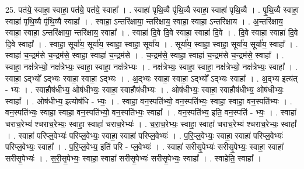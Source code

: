 \documentclass[17pt]{extarticle}
\begin{document}
25. पत॑ये॒ स्वाहा॒ स्वाहा॒ पत॑ये॒ पत॑ये॒ स्वाहा᳚ । . स्वाहा॑ पृथि॒व्यै पृ॑थि॒व्यै स्वाहा॒ स्वाहा॑ पृथि॒व्यै । . पृ॒थि॒व्यै स्वाहा॒ स्वाहा॑ पृथि॒व्यै पृ॑थि॒व्यै स्वाहा᳚ । . स्वाहा॒ ऽन्तरि॑क्षाया॒ न्तरि॑क्षाय॒ स्वाहा॒ स्वाहा॒ ऽन्तरि॑क्षाय । . अ॒न्तरि॑क्षाय॒ स्वाहा॒ स्वाहा॒ ऽन्तरि॑क्षाया॒ न्तरि॑क्षाय॒ स्वाहा᳚ । . स्वाहा॑ दि॒वे दि॒वे स्वाहा॒ स्वाहा॑ दि॒वे । . दि॒वे स्वाहा॒ स्वाहा॑ दि॒वे दि॒वे स्वाहा᳚ । . स्वाहा॒ सूर्या॑य॒ सूर्या॑य॒ स्वाहा॒ स्वाहा॒ सूर्या॑य । . सूर्या॑य॒ स्वाहा॒ स्वाहा॒ सूर्या॑य॒ सूर्या॑य॒ स्वाहा᳚ । . स्वाहा॑ च॒न्द्रम॑से च॒न्द्रम॑से॒ स्वाहा॒ स्वाहा॑ च॒न्द्रम॑से । . च॒न्द्रम॑से॒ स्वाहा॒ स्वाहा॑ च॒न्द्रम॑से च॒न्द्रम॑से॒ स्वाहा᳚ । . स्वाहा॒ नक्ष॑त्रेभ्यो॒ नक्ष॑त्रेभ्यः॒ स्वाहा॒ स्वाहा॒ नक्ष॑त्रेभ्यः । . नक्ष॑त्रेभ्यः॒ स्वाहा॒ स्वाहा॒ नक्ष॑त्रेभ्यो॒ नक्ष॑त्रेभ्यः॒ स्वाहा᳚ । . स्वाहा॒ ऽद्भ्यो᳚ ऽद्भ्यः स्वाहा॒ स्वाहा॒ ऽद्भ्यः । . अ॒द्भ्यः स्वाहा॒ स्वाहा॒ ऽद्भ्यो᳚ ऽद्भ्यः स्वाहा᳚ । . अ॒द्भ्य इत्य॑त् - भ्यः । . स्वाहौष॑धीभ्य॒ ओष॑धीभ्यः॒ स्वाहा॒ स्वाहौष॑धीभ्यः । . ओष॑धीभ्यः॒ स्वाहा॒ स्वाहौष॑धीभ्य॒ ओष॑धीभ्यः॒ स्वाहा᳚ । . ओष॑धीभ्य॒ इत्योष॑धि - भ्यः॒ । . स्वाहा॒ वन॒स्पति॑भ्यो॒ वन॒स्पति॑भ्यः॒ स्वाहा॒ स्वाहा॒ वन॒स्पति॑भ्यः । . वन॒स्पति॑भ्यः॒ स्वाहा॒ स्वाहा॒ वन॒स्पति॑भ्यो॒ वन॒स्पति॑भ्यः॒ स्वाहा᳚ । . वन॒स्पति॑भ्य॒ इति॒ वन॒स्पति॑ - भ्यः॒ । . स्वाहा॑ चराच॒रेभ्य॑ श्चराच॒रेभ्यः॒ स्वाहा॒ स्वाहा॑ चराच॒रेभ्यः॑ । . च॒रा॒च॒रेभ्यः॒ स्वाहा॒ स्वाहा॑ चराच॒रेभ्य॑ श्चराच॒रेभ्यः॒ स्वाहा᳚ । . स्वाहा॑ परिप्ल॒वेभ्यः॑ परिप्ल॒वेभ्यः॒ स्वाहा॒ स्वाहा॑ परिप्ल॒वेभ्यः॑ । . प॒रि॒प्ल॒वेभ्यः॒ स्वाहा॒ स्वाहा॑ परिप्ल॒वेभ्यः॑ परिप्ल॒वेभ्यः॒ स्वाहा᳚ । . प॒रि॒प्ल॒वेभ्य॒ इति॑ परि - प्ल॒वेभ्यः॑ । . स्वाहा॑ सरीसृ॒पेभ्यः॑ सरीसृ॒पेभ्यः॒ स्वाहा॒ स्वाहा॑ सरीसृ॒पेभ्यः॑ । . स॒री॒सृ॒पेभ्यः॒ स्वाहा॒ स्वाहा॑ सरीसृ॒पेभ्यः॑ सरीसृ॒पेभ्यः॒ स्वाहा᳚ । . स्वाहेति॒ स्वाहा᳚ । \newline
\end{document}
